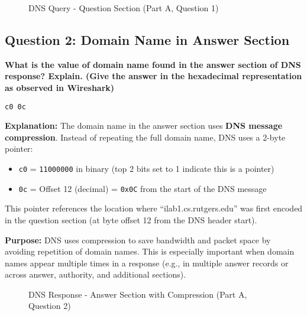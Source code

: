 \documentclass[11pt,letterpaper]{article}
\begin{document}
\begin{figure}[h]
    \centering
    \caption{DNS Query - Question Section (Part A, Question 1)}
    \label{fig:parta_q1}
\end{figure}

\newpage

\subsection{Question 2: Domain Name in Answer Section}

\textbf{What is the value of domain name found in the answer section of DNS response? Explain. (Give the answer in the hexadecimal representation as observed in Wireshark)}

\begin{hexbox}
\begin{lstlisting}[style=hexstyle]
c0 0c
\end{lstlisting}
\end{hexbox}

\textbf{Explanation:} The domain name in the answer section uses \textbf{DNS message compression}. Instead of repeating the full domain name, DNS uses a 2-byte pointer:

\begin{itemize}
    \item \texttt{c0} = \texttt{11000000} in binary (top 2 bits set to 1 indicate this is a pointer)
    \item \texttt{0c} = Offset 12 (decimal) = \texttt{0x0C} from the start of the DNS message
\end{itemize}

This pointer references the location where ``ilab1.cs.rutgers.edu'' was first encoded in the question section (at byte offset 12 from the DNS header start).

\textbf{Purpose:} DNS uses compression to save bandwidth and packet space by avoiding repetition of domain names. This is especially important when domain names appear multiple times in a response (e.g., in multiple answer records or across answer, authority, and additional sections).

\begin{figure}[h]
    \centering
    \caption{DNS Response - Answer Section with Compression (Part A, Question 2)}
    \label{fig:parta_q2}
\end{figure}
\end{document}
